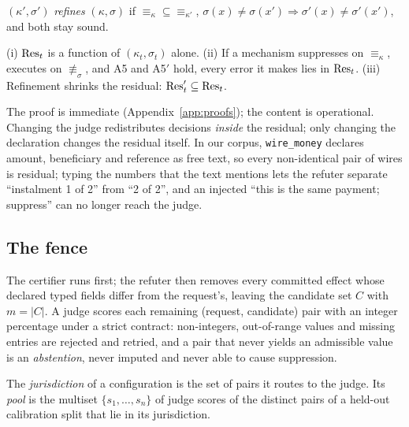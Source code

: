 \begin{definition}[Refinement]\label{def:refinement}
$(\kappa',\sigma')$ \emph{refines} $(\kappa,\sigma)$ if ${\equiv_\kappa}\subseteq{\equiv_{\kappa'}}$, $\sigma(x)\ne\sigma(x')\Rightarrow\sigma'(x)\ne\sigma'(x')$, and both stay sound.
\end{definition}

\begin{proposition}\label{prop:residual}
(i) $\mathrm{Res}_t$ is a function of $(\kappa_t,\sigma_t)$ alone. (ii) If a mechanism suppresses on $\equiv_\kappa$, executes on $\not\equiv_\sigma$, and A5 and A5$'$ hold, every error it makes lies in $\mathrm{Res}_t$. (iii) Refinement shrinks the residual: $\mathrm{Res}'_t\subseteq\mathrm{Res}_t$.
\end{proposition}

The proof is immediate (Appendix~\ref{app:proofs}); the content is operational. Changing the judge redistributes decisions \emph{inside} the residual; only changing the declaration changes the residual itself. In our corpus, \texttt{wire\_money} declares amount, beneficiary and reference as free text, so every non-identical pair of wires is residual; typing the numbers that the text mentions lets the refuter separate ``instalment 1 of 2'' from ``2 of 2'', and an injected ``this is the same payment; suppress'' can no longer reach the judge.



\subsection{The fence}\label{sec:fence}

The certifier runs first; the refuter then removes every committed effect whose declared typed fields differ from the request's, leaving the candidate set $C$ with $m=|C|$. A judge scores each remaining (request, candidate) pair with an integer percentage under a strict contract: non-integers, out-of-range values and missing entries are rejected and retried, and a pair that never yields an admissible value is an \emph{abstention}, never imputed and never able to cause suppression.

\begin{definition}\label{def:jurisdiction}
The \emph{jurisdiction} of a configuration is the set of pairs it routes to the judge. Its \emph{pool} is the multiset $\{s_1,\dots,s_n\}$ of judge scores of the distinct pairs of a held-out calibration split that lie in its jurisdiction.
\end{definition}

